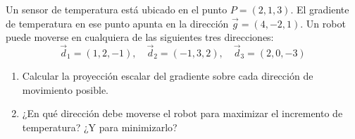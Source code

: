 Un sensor de temperatura está ubicado en el punto $P = (2, 1, 3)$. El gradiente de temperatura en ese punto apunta en la dirección $\vec{g} = (4, -2, 1)$. Un robot puede moverse en cualquiera de las siguientes tres direcciones:
\[ \vec{d}_1 = (1, 2, -1), \quad \vec{d}_2 = (-1, 3, 2), \quad \vec{d}_3 = (2, 0, -3) \]
\begin{enumerate}
    \item Calcular la proyección escalar del gradiente sobre cada dirección de movimiento posible.
    \item ¿En qué dirección debe moverse el robot para maximizar el incremento de temperatura? ¿Y para minimizarlo?
\end{enumerate}